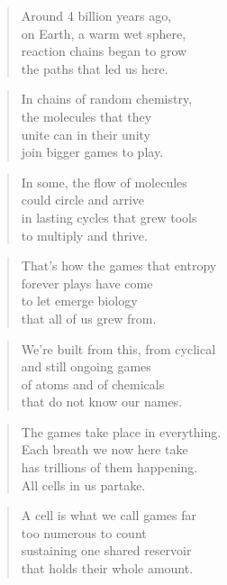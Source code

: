 \documentclass[14pt,a4paper]{article}
\begin{document}
\begin{verse}
Around 4 billion years ago,\\
on Earth, a warm wet sphere,\\
reaction chains began to grow\\
the paths that led us here.
\end{verse}

\begin{verse}
In chains of random chemistry,\\
the molecules that they\\
unite can in their unity\\
join bigger games to play.
\end{verse}

\begin{verse}
In some, the flow of molecules\\
could circle and arrive\\
in lasting cycles that grew tools\\
to multiply and thrive.
\end{verse}

\begin{verse}
That’s how the games that entropy\\
forever plays have come\\
to let emerge biology\\
that all of us grew from.
\end{verse}

\begin{verse}
We’re built from this, from cyclical\\
and still ongoing games\\
of atoms and of chemicals\\
that do not know our names.
\end{verse}

\begin{verse}
The games take place in everything.\\
Each breath we now here take\\
has trillions of them happening.\\
All cells in us partake.
\end{verse}

\begin{verse}
A cell is what we call games far\\
too numerous to count\\
sustaining one shared reservoir\\
that holds their whole amount.
\end{verse}
\end{document}
